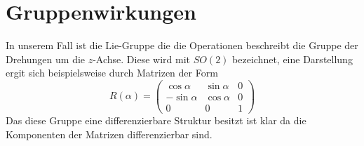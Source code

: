 \section{Gruppenwirkungen}
In unserem Fall ist die Lie-Gruppe die die Operationen beschreibt die Gruppe der
Drehungen um die $z$-Achse. Diese wird mit $SO(2)$ bezeichnet, eine Darstellung
ergit sich beispielsweise durch Matrizen der Form
\begin{equation}
R(\alpha)=
\begin{pmatrix}
\cos\alpha&\sin\alpha&0\\
-\sin\alpha&\cos\alpha&0\\
0&0&1
\end{pmatrix}
\end{equation}
Das diese Gruppe eine differenzierbare Struktur besitzt ist klar da die
Komponenten der Matrizen differenzierbar sind.
\begin{definition}

\end{definition}

